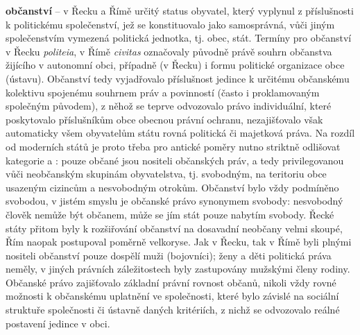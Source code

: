 \documentclass{article}
\begin{document}
  {\bf občanství} -- v Řecku a Římě určitý status obyvatel, který vyplynul z příslušnosti k politickému společenství, jež se konstituovalo jako samosprávná, vůči jiným společenstvím vymezená politická jednotka, tj. obec, stát. Termíny pro občanství v Řecku {\it politeia}, v Římě {\it civitas} označovaly původně právě souhrn občanstva žijícího v autonomní obci, případně (v Řecku) i formu politické organizace obce (ústavu). Občanství tedy vyjadřovalo příslušnost jedince k určitému občanskému kolektivu spojenému souhrnem práv a povinností (často i proklamovaným společným původem), z něhož se teprve odvozovalo právo individuální, které poskytovalo příslušníkům obce obecnou právní ochranu, nezajišťovalo však automaticky všem obyvatelům státu rovná politická či majetková práva. Na rozdíl od moderních států je proto třeba pro antické poměry nutno striktně odlišovat kategorie  a : pouze občané jsou nositeli občanských práv, a tedy privilegovanou  vůči neobčanským skupinám obyvatelstva, tj. svobodným, na teritoriu obce usazeným cizincům a nesvobodným otrokům. Občanství bylo vždy podmíněno svobodou, v jistém smyslu je občanské právo synonymem svobody: nesvobodný člověk nemůže být občanem, může se jím stát pouze nabytím svobody. Řecké státy přitom byly k rozšiřování občanství na dosavadní neobčany velmi skoupé, Řím naopak postupoval poměrně velkoryse. Jak v Řecku, tak v Římě byli plnými nositeli občanství pouze dospělí muži (bojovníci); ženy a děti politická práva neměly, v jiných právních záležitostech byly zastupovány mužskými členy rodiny. Občanské právo zajišťovalo základní právní rovnost občanů, nikoli vždy rovné možnosti k  občanskému uplatnění ve společnosti, které bylo závislé na sociální struktuře společnosti či ústavně daných kritériích, z nichž se odvozovalo reálné postavení jedince v obci.
\end{document}
